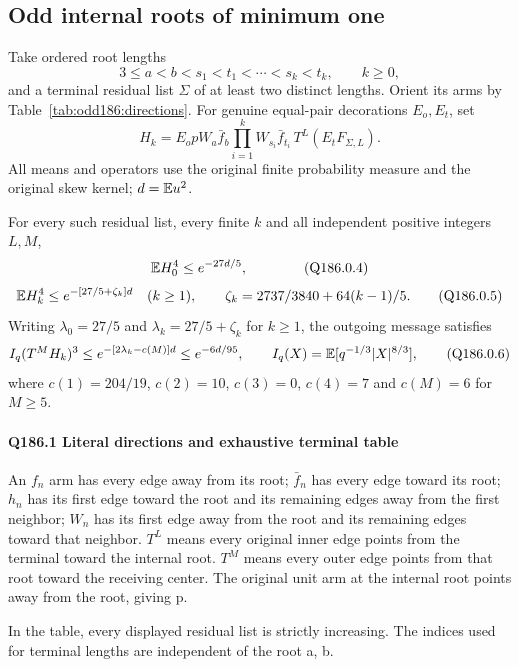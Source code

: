 \subsection{Odd internal roots of minimum one}
\label{proof:Q5-C186}

Take ordered root lengths
\[
 3\le a<b<s_1<t_1<\cdots<s_k<t_k,\qquad k\ge0,
 \tag{Q186.0.2}
\]
and a terminal residual list $\Sigma$ of at least two distinct
lengths. Orient its arms by Table~\ref{tab:odd186:directions}.
For genuine equal-pair decorations $E_o,E_t$, set
\[
 H_k=E_o pW_a\bar f_b
          \prod_{i=1}^kW_{s_i}\bar f_{t_i}\,
          T^L(E_tF_{\Sigma,L}).
 \tag{Q186.0.3}
\]
All means and operators use the original finite probability measure
and the original skew kernel; $d=\mathbb E u^2$.

\begin{proposition}\label{prop:odd-complete:minimum-one-root}
For every such residual list, every finite $k$ and all independent
positive integers $L,M$,
\[
 \mathbb E H_0^4\le e^{-27d/5},\qquad
 \tag{Q186.0.4}
\]
\[
 \mathbb E H_k^4\le e^{-[27/5+\zeta_k]d}\quad(k\ge1),\qquad
 \zeta_k=2737/3840+64(k-1)/5.
 \tag{Q186.0.5}
\]
Writing $\lambda_0=27/5$ and $\lambda_k=27/5+\zeta_k$ for
$k\ge1$, the outgoing message satisfies
\[
 I_q(T^MH_k)^3\le e^{-[2\lambda_k-c(M)]d}\le e^{-6d/95},
 \qquad I_q(X)=\mathbb E[q^{-1/3}|X|^{8/3}],
 \tag{Q186.0.6}
\]
where $c(1)=204/19$, $c(2)=10$, $c(3)=0$, $c(4)=7$ and
$c(M)=6$ for $M\ge5$.
\end{proposition}

\paragraph{Q186.1 Literal directions and exhaustive terminal table}\label{part:Q186.1}

An \(f_n\) arm has every edge away from its root; \(\bar f_n\) has every edge toward its
root; \(h_n\) has its first edge toward the root and its remaining edges away
from the first neighbor; \(W_n\) has its first edge away from the root and its
remaining edges toward that neighbor. \(T^L\) means every original inner edge
points from the terminal toward the internal root. \(T^M\) means every outer
edge points from that root toward the receiving center. The original unit
arm at the internal root points away from the root, giving p.

In the table, every displayed residual list is strictly increasing. The
indices used for terminal lengths are independent of the root a, b.

